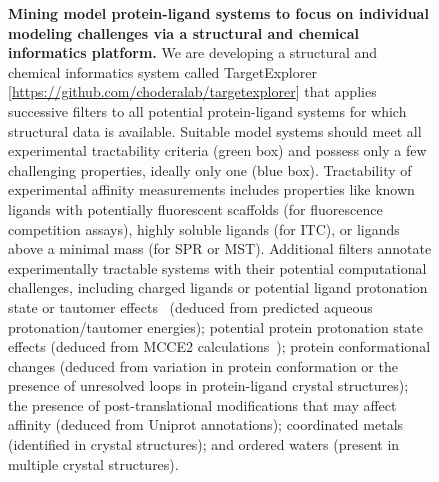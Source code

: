 \documentclass[11pt]{article}
\begin{document}
\begin{figure}
\begin{centering}
\end{centering}
\footnotesize
\caption{\label{figure:mining-for-model-systems}  
\textbf{Mining model protein-ligand systems to focus on individual modeling challenges via a structural and chemical informatics platform.}
We are developing a structural and chemical informatics system called TargetExplorer [\url{https://github.com/choderalab/targetexplorer}] that applies successive filters to all potential protein-ligand systems for which structural data is available. 
Suitable model systems should meet all experimental tractability criteria (green box) and possess only a few challenging properties, ideally only one (blue box).
Tractability of experimental affinity measurements includes properties like known ligands with potentially fluorescent scaffolds (for fluorescence competition assays), highly soluble ligands (for ITC), or ligands above a minimal mass (for SPR or MST).
Additional filters annotate experimentally tractable systems with their potential computational challenges, including charged ligands or potential ligand protonation state or tautomer effects~\cite{Martin:2009:JournalofComputer-AidedMolecularDesign} (deduced from predicted aqueous protonation/tautomer energies); potential protein protonation state effects (deduced from MCCE2 calculations~\cite{Song:2009:JournalofComputationalChemistry}); protein conformational changes (deduced from variation in protein conformation or the presence of unresolved loops in protein-ligand crystal structures); the presence of post-translational modifications that may affect affinity (deduced from Uniprot annotations); coordinated metals (identified in crystal structures); and ordered waters (present in multiple crystal structures).
}
\end{figure}
\end{document}
